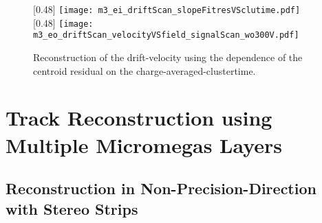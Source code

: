 \documentclass[
twoside,            %
BCOR1.4cm,          %
10pt,               %
headings=normal,    %
headsepline,        %
clearplainpage,		%
final,              %
div=14,
open=right,
bibliography=toc
]{scrreprt}
\begin{document}
\begin{figure}[!h]
	\centering
	[0.48\textwidth]
	{\texttt{[image: m3\_ei\_driftScan\_slopeFitresVSclutime.pdf]}}
	\hfill
	[0.48\textwidth]
	{\texttt{[image: m3\_eo\_driftScan\_velocityVSfield\_signalScan\_wo300V.pdf]}}
	\vspace{-2mm}
	\caption{
		Reconstruction of the drift-velocity using the dependence of the centroid residual on the charge-averaged-clustertime.
	}
\end{figure}



\section{Track Reconstruction using Multiple Micromegas Layers}

\subsection{Reconstruction in Non-Precision-Direction with Stereo Strips}\label{stereoReconstruction}
\end{document}
